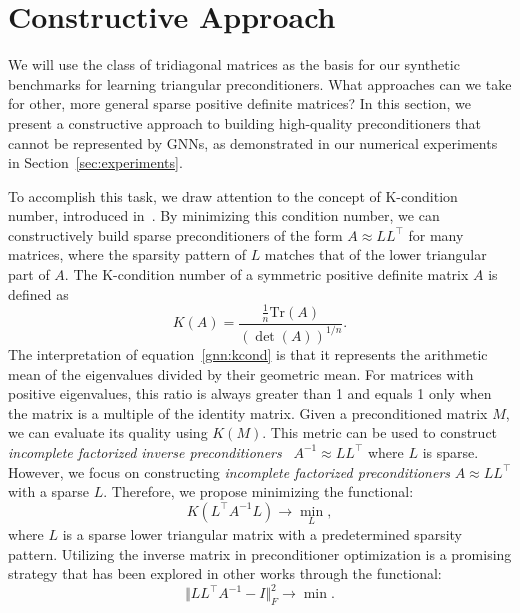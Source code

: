 \documentclass[10pt]{article} %
\def\eqref#1{equation~\ref{#1}}
\theoremstyle{plain}
\theoremstyle{definition}
\theoremstyle{remark}
\begin{document}
\section{Constructive Approach}
We will use the class of tridiagonal matrices as the basis for our synthetic benchmarks for learning triangular preconditioners. What approaches can we take for other, more general sparse positive definite matrices? In this section, we present a constructive approach to building high-quality preconditioners that cannot be represented by GNNs, as demonstrated in our numerical experiments in Section~\ref{sec:experiments}.

To accomplish this task, we draw attention to the concept of K-condition number, introduced in~\citet{kaporin1994new}. By minimizing this condition number, we can constructively build sparse preconditioners of the form $A \approx LL^{\top}$ for many matrices, where the sparsity pattern of $L$ matches that of the lower triangular part of $A$. The K-condition number of a symmetric positive definite matrix $A$ is defined as
\begin{equation}\label{gnn:kcond}
	K(A) = \frac{\frac{1}{n}\mathrm{Tr}(A)}{\left(\det(A)\right)^{1/n}}.
\end{equation}
The interpretation of \eqref{gnn:kcond} is that it represents the arithmetic mean of the eigenvalues divided by their geometric mean. For matrices with positive eigenvalues, this ratio is always greater than 1 and equals 1 only when the matrix is a multiple of the identity matrix. Given a preconditioned matrix $M$, we can evaluate its quality using $K(M)$. This metric can be used to construct \emph{incomplete factorized inverse preconditioners}~\citep{kaporin1994new, chen2024lightning} $A^{-1} \approx LL^{\top}$ where $L$ is sparse. However, we focus on constructing \emph{incomplete factorized preconditioners} $A \approx LL^{\top}$ with a sparse $L$. Therefore, we propose minimizing the functional:
\begin{equation}\label{gnn:kopt_inv}
   K(L^{\top} A^{-1} L) \rightarrow \min_L,
\end{equation}
where $L$ is a sparse lower triangular matrix with a predetermined sparsity pattern. Utilizing the inverse matrix in preconditioner optimization is a promising strategy that has been explored in other works \citep{li2023learning,trifonov2024learning} through the functional:
\begin{equation}\label{gnn:low_freq_loss}
   \Vert LL^{\top} A^{-1} - I \Vert^2_F \rightarrow \min.
\end{equation}
\end{document}
